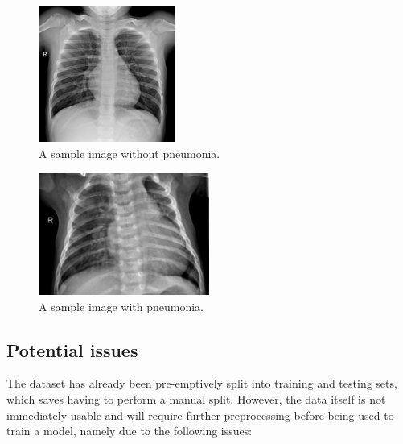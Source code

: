 \documentclass[12pt]{report}
\begin{document}
\begin{figure}[H]
    \centering
    \includegraphics[width=0.4\textwidth]{Proposal/SampleNORMAL.jpeg}
    \caption{A sample image without pneumonia.\label{fig:SampleNORMAL}}
\end{figure}

\begin{figure}[H]
    \centering
    \includegraphics[width=0.5\textwidth]{Proposal/SamplePNEUMONIA.jpeg}
    \caption{A sample image with pneumonia.\label{fig:SamplePNEUMONIA}}
\end{figure}

\subsection{Potential issues}
The dataset has already been pre-emptively split into training and testing sets, which saves having to perform a manual split. 
However, the data itself is not immediately usable and will require further preprocessing before being used to train a model, namely due to the 
following issues:
\end{document}
